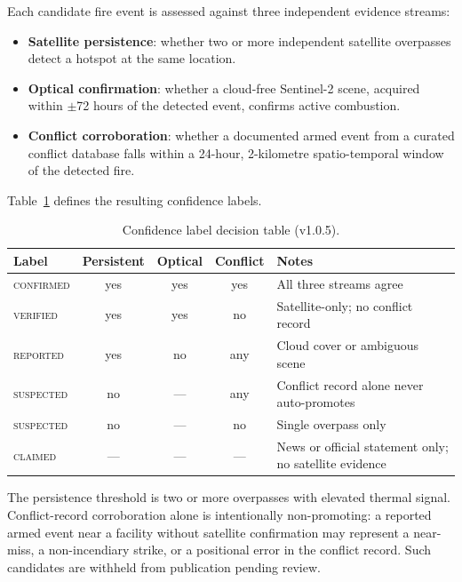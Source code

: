\documentclass[11pt]{article}
\begin{document}
Each candidate fire event is assessed against three independent evidence
streams:
\begin{itemize}
\item \textbf{Satellite persistence}: whether two or more independent
  satellite overpasses detect a hotspot at the same location.
\item \textbf{Optical confirmation}: whether a cloud-free Sentinel-2
  scene, acquired within $\pm$72 hours of the detected event, confirms
  active combustion.
\item \textbf{Conflict corroboration}: whether a documented armed event
  from a curated conflict database falls within a 24-hour, 2-kilometre
  spatio-temporal window of the detected fire.
\end{itemize}

Table~\ref{tab:confidence} defines the resulting confidence labels.

\begin{table}[h]
\centering
\caption{Confidence label decision table (v1.0.5).}
\label{tab:confidence}
\begin{tabular}{@{}lcccp{4.5cm}@{}}
\toprule
\textbf{Label} & \textbf{Persistent} &
\textbf{Optical} & \textbf{Conflict} & \textbf{Notes} \\
\midrule
\textsc{confirmed}  & yes & yes & yes & All three streams agree \\
\textsc{verified}   & yes & yes & no  & Satellite-only; no conflict record \\
\textsc{reported}   & yes & no  & any & Cloud cover or ambiguous scene \\
\textsc{suspected}  & no  & --- & any & Conflict record alone never auto-promotes \\
\textsc{suspected}  & no  & --- & no  & Single overpass only \\
\textsc{claimed}    & --- & --- & --- & News or official statement only; no satellite evidence \\
\bottomrule
\end{tabular}
\end{table}

The persistence threshold is two or more overpasses with elevated thermal
signal. Conflict-record corroboration alone is intentionally
non-promoting: a reported armed event near a facility without satellite
confirmation may represent a near-miss, a non-incendiary strike, or a
positional error in the conflict record. Such candidates are withheld from
publication pending review.
\end{document}
